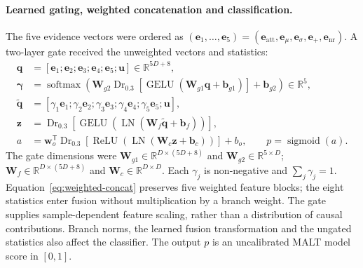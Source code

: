 \paragraph{Learned gating, weighted concatenation and classification.}
The five evidence vectors were ordered as
$(\mathbf{e}_1,\ldots,\mathbf{e}_5)=
(\mathbf{e}_{\mathrm{att}},\mathbf{e}_{\mu},\mathbf{e}_{\sigma},
 \mathbf{e}_{+},\mathbf{e}_{\mathrm{nr}})$.
A two-layer gate received the unweighted vectors and statistics:
\begin{subequations}\label{eq:fusion}
\begin{align}
 \mathbf{q} &= [\mathbf{e}_1;\mathbf{e}_2;\mathbf{e}_3;\mathbf{e}_4;
                   \mathbf{e}_5;\mathbf{u}]\in\mathbb{R}^{5D+8},\\
 \boldsymbol{\gamma} &= \operatorname{softmax}\!\left(
    \mathbf{W}_{g2}\operatorname{Dr}_{0.3}\!\left[
       \operatorname{GELU}(\mathbf{W}_{g1}\mathbf{q}+\mathbf{b}_{g1})\right]
       +\mathbf{b}_{g2}\right)\in\mathbb{R}^{5},\label{eq:gate}\\
 \widetilde{\mathbf{q}} &= [\gamma_1\mathbf{e}_1;\gamma_2\mathbf{e}_2;
       \gamma_3\mathbf{e}_3;\gamma_4\mathbf{e}_4;\gamma_5\mathbf{e}_5;
       \mathbf{u}],\label{eq:weighted-concat}\\
 \mathbf{z} &= \operatorname{Dr}_{0.3}\!\left[
       \operatorname{GELU}\!\left(\operatorname{LN}
       (\mathbf{W}_{f}\widetilde{\mathbf{q}}+\mathbf{b}_{f})\right)\right],\\
 a &= \mathbf{w}_{o}^{\mathsf T}\operatorname{Dr}_{0.3}\!\left[
       \operatorname{ReLU}\!\left(\operatorname{LN}
       (\mathbf{W}_{c}\mathbf{z}+\mathbf{b}_{c})\right)\right]+b_o,
       \qquad p=\operatorname{sigmoid}(a).
\end{align}
\end{subequations}
The gate dimensions were $\mathbf{W}_{g1}\in\mathbb{R}^{D\times(5D+8)}$
and $\mathbf{W}_{g2}\in\mathbb{R}^{5\times D}$;
$\mathbf{W}_{f}\in\mathbb{R}^{D\times(5D+8)}$ and
$\mathbf{W}_{c}\in\mathbb{R}^{D\times D}$.
Each $\gamma_j$ is non-negative and $\sum_j\gamma_j=1$.
Equation~\eqref{eq:weighted-concat} preserves five weighted feature blocks;
the eight statistics enter fusion without multiplication by a branch weight.
The gate supplies sample-dependent feature scaling, rather than a distribution
of causal contributions. Branch norms, the learned fusion transformation and
the ungated statistics also affect the classifier. The output $p$ is an
uncalibrated MALT model score in $[0,1]$.

